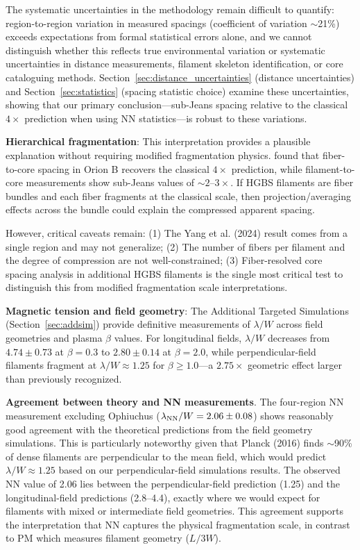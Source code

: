\documentclass[twoside,twocolumn]{mnras}
\begin{document}
The systematic uncertainties in the methodology remain difficult to quantify: region-to-region variation in measured spacings (coefficient of variation $\sim$21\%) exceeds expectations from formal statistical errors alone, and we cannot distinguish whether this reflects true environmental variation or systematic uncertainties in distance measurements, filament skeleton identification, or core cataloguing methods. Section~\ref{sec:distance_uncertainties} (distance uncertainties) and Section~\ref{sec:statistics} (spacing statistic choice) examine these uncertainties, showing that our primary conclusion---sub-Jeans spacing relative to the classical $4\times$ prediction when using NN statistics---is robust to these variations.

\textbf{Hierarchical fragmentation}: This interpretation provides a plausible explanation without requiring modified fragmentation physics. \citet{Yang2024} found that fiber-to-core spacing in Orion B recovers the classical $4\times$ prediction, while filament-to-core measurements show sub-Jeans values of $\sim2$--$3\times$. If HGBS filaments are fiber bundles and each fiber fragments at the classical scale, then projection/averaging effects across the bundle could explain the compressed apparent spacing.

However, critical caveats remain: (1) The Yang et al. (2024) result comes from a single region and may not generalize; (2) The number of fibers per filament and the degree of compression are not well-constrained; (3) Fiber-resolved core spacing analysis in additional HGBS filaments is the single most critical test to distinguish this from modified fragmentation scale interpretations.

\textbf{Magnetic tension and field geometry}: The Additional Targeted Simulations (Section~\ref{sec:addsim}) provide definitive measurements of $\lambda/W$ across field geometries and plasma $\beta$ values. For longitudinal fields, $\lambda/W$ decreases from $4.74 \pm 0.73$ at $\beta = 0.3$ to $2.80 \pm 0.14$ at $\beta = 2.0$, while perpendicular-field filaments fragment at $\lambda/W \approx 1.25$ for $\beta \geq 1.0$---a $2.75\times$ geometric effect larger than previously recognized.

\textbf{Agreement between theory and NN measurements}. The four-region NN measurement excluding Ophiuchus ($\lambda_{\rm NN}/W = 2.06 \pm 0.08$) shows reasonably good agreement with the theoretical predictions from the field geometry simulations. This is particularly noteworthy given that Planck (2016) finds $\sim$90\% of dense filaments are perpendicular to the mean field, which would predict $\lambda/W \approx 1.25$ based on our perpendicular-field simulations results. The observed NN value of 2.06 lies between the perpendicular-field prediction (1.25) and the longitudinal-field predictions (2.8--4.4), exactly where we would expect for filaments with mixed or intermediate field geometries. This agreement supports the interpretation that NN captures the physical fragmentation scale, in contrast to PM which measures filament geometry ($L/3W$).
\end{document}
